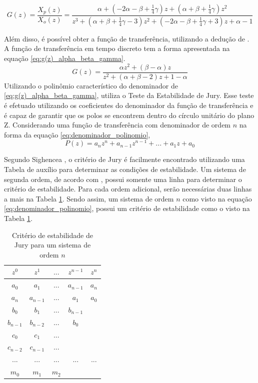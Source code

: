 \begin{equation}
G(z) = \frac{X_p(z)}{X_o(z)} = \frac{\alpha+(-2\alpha-\beta+\frac{1}{4}\gamma)z+(\alpha+\beta+\frac{1}{4}\gamma)z^2}{z^3+(\alpha+\beta+\frac{1}{4}\gamma-3)z^2+(-2\alpha-\beta+\frac{1}{4}\gamma+3)z+\alpha-1} \label{eq:g(z)_alpha_beta_gamma_pols}
\end{equation}

Além disso, é possível obter a função de transferência, utilizando a dedução de \cite{ekstrand2012}. A função de transferência em tempo discreto tem a forma apresentada na equação \eqref{eq:g(z)_alpha_beta_gamma}.
\begin{equation}
G(z) = \frac{\alpha z^2+(\beta - \alpha)z}{z^2+(\alpha+\beta-2)z+1- \alpha} \label{eq:g(z)_alpha_beta_gamma}
\end{equation}
Utilizando o polinômio característico do denominador de \eqref{eq:g(z)_alpha_beta_gamma}, \cite{tenne2000} utiliza o Teste da Estabilidade de Jury.
Esse teste é efetuado utilizando os coeficientes do denominador da função de transferência e é capaz de garantir que os polos se encontrem dentro do círculo unitário do plano Z.
Considerando uma função de transferência com denominador de ordem $n$ na forma da equação \eqref{eq:denominador_polinomio},
\begin{equation}
P(z) = a_nz^n + a_{n-1}z^{n-1} + ... + a_1z + a_0 \label{eq:denominador_polinomio}
\end{equation}

Segundo Sighencea \citeyear{sighencea2022}, o critério de Jury é facilmente encontrado utilizando uma Tabela de auxílio para determinar as condições de estabilidade.
Um sistema de segunda ordem, de acordo com \cite{sighencea2022}, possui somente uma linha para determinar o critério de estabilidade.
Para cada ordem adicional, serão necessárias duas linhas a mais na Tabela \ref{tab:criterio_Jury}.
Sendo assim, um  sistema de ordem $n$ como visto na equação \eqref{eq:denominador_polinomio}, possui um critério de estabilidade como o visto na Tabela \ref{tab:criterio_Jury}.
\begin{table}[htbp]
\centering
\caption{Critério de estabilidade de Jury para um sistema de ordem $n$}
\begin{tabular}{ccccc}
    \hline
    $z^0$ & $z^1$ & $...$ & $z^{n-1}$ & $z^n$ \\
    \hline
    $a_0$ & $a_1$ & $...$ & $a_{n-1}$ & $a_n$ \\
    $a_n$ & $a_{n-1}$ & $...$ & $a_1$ & $a_0$ \\
    $b_0$ & $b_1$ & $...$ & $b_{n-1}$ &  \\
    $b_{n-1}$ & $b_{n-2}$ & $...$ & $b_0$ &  \\
    $c_0$ & $c_1$ & $...$ &  &  \\
    $c_{n-2}$ & $c_{n-1}$ & $...$ &  &  \\
    $...$ & $...$ & $...$ & $...$ & $...$ \\
    $m_0$ & $m_1$ & $m_2$ &  &
\end{tabular}
\label{tab:criterio_Jury}
\end{table}

